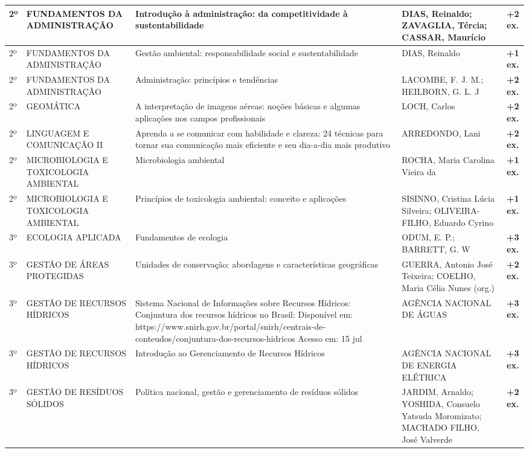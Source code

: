 \documentclass[11pt,a4paper]{article}
\begin{document}
\begin{longtable}{|p{1.2cm}|p{3.5cm}|p{6cm}|p{3.5cm}|c|}
2º & FUNDAMENTOS DA ADMINISTRAÇÃO & Introdução à administração: da competitividade à sustentabilidade & DIAS, Reinaldo; ZAVAGLIA, Tércia; CASSAR, Maurício & \textbf{+2 ex.} \\ \hline
2º & FUNDAMENTOS DA ADMINISTRAÇÃO & Gestão ambiental: responsabilidade social e sustentabilidade & DIAS, Reinaldo & \textbf{+1 ex.} \\ \hline
2º & FUNDAMENTOS DA ADMINISTRAÇÃO & Administração: princípios e tendências & LACOMBE, F. J. M.; HEILBORN, G. L. J & \textbf{+2 ex.} \\ \hline
2º & GEOMÁTICA & A interpretação de imagens aéreas: noções básicas e algumas aplicações nos campos profissionais & LOCH, Carlos & \textbf{+2 ex.} \\ \hline
2º & LINGUAGEM E COMUNICAÇÃO II & Aprenda a se comunicar com habilidade e clareza: 24 técnicas para tornar sua comunicação mais eficiente e seu dia-a-dia mais produtivo & ARREDONDO, Lani & \textbf{+2 ex.} \\ \hline
2º & MICROBIOLOGIA E TOXICOLOGIA AMBIENTAL & Microbiologia ambiental & ROCHA, Maria Carolina Vieira da & \textbf{+1 ex.} \\ \hline
2º & MICROBIOLOGIA E TOXICOLOGIA AMBIENTAL & Princípios de toxicologia ambiental: conceito e aplicações & SISINNO, Cristina Lúcia Silveira; OLIVEIRA-FILHO, Eduardo Cyrino & \textbf{+1 ex.} \\ \hline
3º & ECOLOGIA APLICADA & Fundamentos de ecologia & ODUM, E. P.; BARRETT, G. W & \textbf{+3 ex.} \\ \hline
3º & GESTÃO DE ÁREAS PROTEGIDAS & Unidades de conservação: abordagens e características geográficas & GUERRA, Antonio José Teixeira; COELHO, Maria Célia Nunes (org.) & \textbf{+2 ex.} \\ \hline
3º & GESTÃO DE RECURSOS HÍDRICOS & Sistema Nacional de Informações sobre Recursos Hídricos: Conjuntura dos recursos hídricos no Brasil: Disponível em: https://www.snirh.gov.br/portal/snirh/centrais-de-conteudos/conjuntura-dos-recursos-hidricos Acesso em: 15 jul & AGÊNCIA NACIONAL DE ÁGUAS & \textbf{+3 ex.} \\ \hline
3º & GESTÃO DE RECURSOS HÍDRICOS & Introdução ao Gerenciamento de Recursos Hídricos & AGÊNCIA NACIONAL DE ENERGIA ELÉTRICA & \textbf{+3 ex.} \\ \hline
3º & GESTÃO DE RESÍDUOS SÓLIDOS & Política nacional, gestão e gerenciamento de resíduos sólidos & JARDIM, Arnaldo; YOSHIDA, Consuelo Yatsuda Moromizato; MACHADO FILHO, José Valverde & \textbf{+2 ex.} \\ \hline

\end{longtable}
\end{document}

